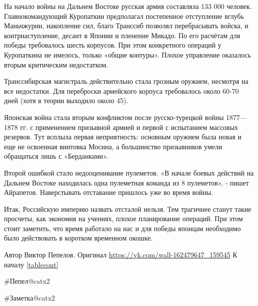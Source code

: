 На начало войны на Дальнем Востоке русская армия составляла 133 000 человек. Главнокомандующий Куропаткин предполагал постепенное отступление вглубь Маньчжурии, накопление сил, благо Транссиб позволял перебрасывать войска, и контрнаступление, десант в Японии и пленение Микадо. По его расчётам для победы требовалось шесть корпусов. При этом конкретного операций у Куропаткина не имелось, только «общие контуры». Плохое управление оказалось вторым критическим недостатком.

Транссибирская магистраль действительно стала грозным оружием, несмотря на все недостатки. Для переброски армейского корпуса требовалось около 60-70 дней (хотя в теории выходило около 45).

Японская война стала вторым конфликтом после русско-турецкой войны 1877—1878 гг. с применением призывной армией и первой с испытанием массовых резервов. Тут всплыла первая неприятность: основным оружием была новая и еще не освоенная винтовка Мосина, а большинство призывников умели обращаться лишь с «Берданками».

Второй ошибкой стало недооценивание пулеметов. «В начале боевых действий на Дальнем Востоке находилась одна пулеметная команда из 8 пулеметов», - пишет Айрапетов. Наверстывать отставание пришлось уже во время войны.

Итак, Российскую империю назвать отсталой нельзя. Тем трагичнее станут такие просчеты, как экономия на учениях, плохое планирование операций. При этом стоит заметить, что время работало на нас и для победы японцам необходимо было действовать в коротком временном окошке.


Автор Виктор Пепелов. Оригинал \url{https://vk.com/wall-162479647_159545} 
К началу \ref{tablecont}

\#Пепел@catx2

\#Заметка@catx2
